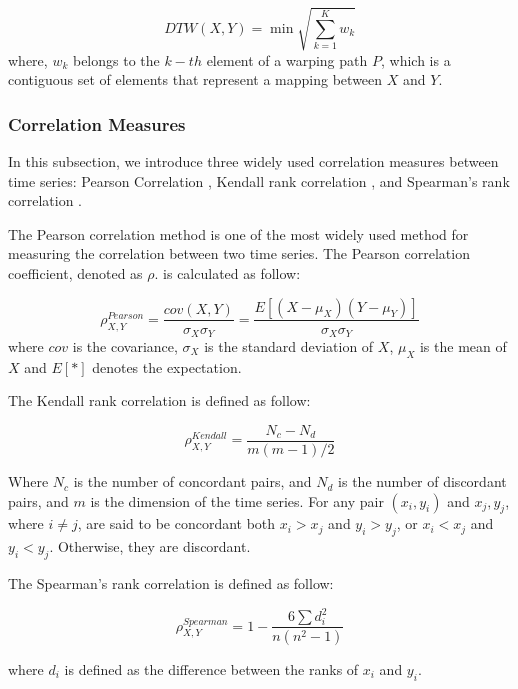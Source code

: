 \begin{equation}
DTW(X,Y) = \min { \sqrt{\sum_{k=1}^{K}w_k}}
\end{equation}
where, $w_k$ belongs to the $k-{th}$ element of a warping path $P$, which is a contiguous set of elements that represent a mapping between $X$ and $Y$.

\subsubsection{Correlation Measures}

In this subsection, we introduce three widely used correlation measures between time series: Pearson Correlation \cite{pearson1904mathematical}, Kendall rank correlation \cite{kendall1938new}, and Spearman's rank correlation \cite{pirie1988spearman}.

The Pearson correlation method is one of the most widely used method for measuring the correlation between two time series. The Pearson correlation coefficient, denoted as $\rho$. is calculated as follow:

\begin{equation*}
\rho_{X,Y}^{Pearson}=\frac{cov(X,Y)}{\sigma_X\sigma_Y}=\frac{E[(X-\mu_X)(Y-\mu_Y)]}{\sigma_X\sigma_Y}
\end{equation*}
where $cov$ is the covariance, $\sigma_X$ is the standard deviation of $X$, $\mu_X$ is the mean of $X$ and $E[*]$ denotes the expectation.

The Kendall rank correlation \cite{kendall1938new} is defined as follow:

\begin{equation*}
\rho_{X,Y}^{Kendall}=\frac{N_c - N_d}{m(m-1)/2}
\end{equation*}

Where $N_c$ is the number of concordant pairs, and $N_d$ is the number of discordant pairs, and $m$ is the dimension of the time series.
For any pair $(x_i,y_i)$ and $x_j,y_j$, where $i \neq j$, are said to be concordant both $x_i > x_j$ and $y_i > y_j$, or $x_i < x_j$ and $y_i < y_j$. Otherwise, they are discordant.

The Spearman's rank correlation \cite{pirie1988spearman} is defined as follow:

\begin{equation*}
\rho_{X,Y}^{Spearman}=1 - \frac{6\sum d^2_i}{n(n^2-1)}
\end{equation*}

where $d_i$ is defined as the difference between the ranks of $x_i$ and $y_i$.

